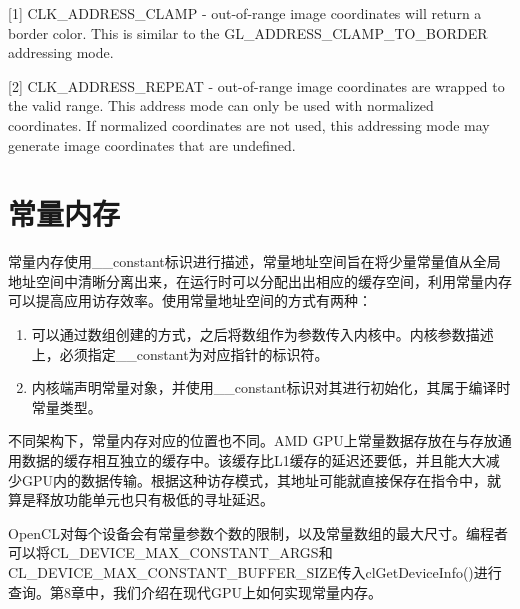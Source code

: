 \myRefRule

\begin{myRefs}

[1] CLK\_\allowbreak{}ADDRESS\_\allowbreak{}CLAMP - out-of-range image coordinates will return a border color. This is similar to the GL\_\allowbreak{}ADDRESS\_\allowbreak{}CLAMP\_\allowbreak{}TO\_\allowbreak{}BORDER addressing mode.

[2] CLK\_\allowbreak{}ADDRESS\_\allowbreak{}REPEAT - out-of-range image coordinates are wrapped to the valid range. This address mode can only be used with normalized coordinates. If normalized coordinates are not used, this addressing mode may generate image coordinates that are undefined.

\end{myRefs}



\section{常量内存}

常量内存使用\_\allowbreak{}\_\allowbreak{}constant标识进行描述，常量地址空间旨在将少量常量值从全局地址空间中清晰分离出来，在运行时可以分配出出相应的缓存空间，利用常量内存可以提高应用访存效率。使用常量地址空间的方式有两种：

\begin{enumerate}
\item 可以通过数组创建的方式，之后将数组作为参数传入内核中。内核参数描述上，必须指定\_\allowbreak{}\_\allowbreak{}constant为对应指针的标识符。
\item 内核端声明常量对象，并使用\_\allowbreak{}\_\allowbreak{}constant标识对其进行初始化，其属于编译时常量类型。
\end{enumerate}

不同架构下，常量内存对应的位置也不同。AMD GPU上常量数据存放在与存放通用数据的缓存相互独立的缓存中。该缓存比L1缓存的延迟还要低，并且能大大减少GPU内的数据传输。根据这种访存模式，其地址可能就直接保存在指令中，就算是释放功能单元也只有极低的寻址延迟。

OpenCL对每个设备会有常量参数个数的限制，以及常量数组的最大尺寸。编程者可以将CL\_\allowbreak{}DEVICE\_\allowbreak{}MAX\_\allowbreak{}CONSTANT\_\allowbreak{}ARGS和CL\_\allowbreak{}DEVICE\_\allowbreak{}MAX\_\allowbreak{}CONSTANT\_\allowbreak{}BUFFER\_\allowbreak{}SIZE传入clGetDeviceInfo()进行查询。第8章中，我们介绍在现代GPU上如何实现常量内存。



